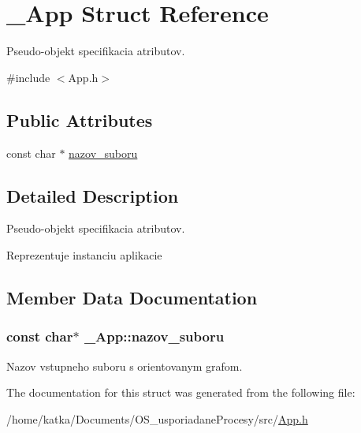 \hypertarget{struct__App}{}\section{\+\_\+\+App Struct Reference}
\label{struct__App}


Pseudo-\/objekt specifikacia atributov.  




{\ttfamily \#include $<$App.\+h$>$}

\subsection*{Public Attributes}
\begin{DoxyCompactItemize}
\item 
const char $\ast$ \hyperlink{struct__App_a75b8ceb6c793d2eafac8395c13fc0b0a}{nazov\+\_\+suboru}
\end{DoxyCompactItemize}


\subsection{Detailed Description}
Pseudo-\/objekt specifikacia atributov. 

Reprezentuje instanciu aplikacie 

\subsection{Member Data Documentation}
\subsubsection[{\texorpdfstring{nazov\+\_\+suboru}{nazov_suboru}}]{\setlength{\rightskip}{0pt plus 5cm}const char$\ast$ \+\_\+\+App\+::nazov\+\_\+suboru}\hypertarget{struct__App_a75b8ceb6c793d2eafac8395c13fc0b0a}{}\label{struct__App_a75b8ceb6c793d2eafac8395c13fc0b0a}
Nazov vstupneho suboru s orientovanym grafom. 

The documentation for this struct was generated from the following file\+:\begin{DoxyCompactItemize}
\item 
/home/katka/\+Documents/\+O\+S\+\_\+usporiadane\+Procesy/src/\hyperlink{App_8h}{App.\+h}\end{DoxyCompactItemize}
